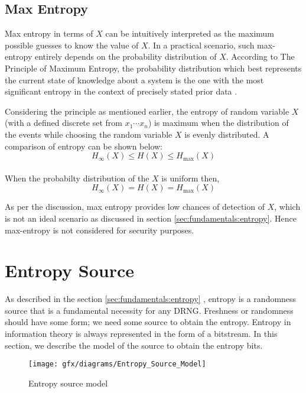%
%
\subsection{Max Entropy}
\label{subsec:fundamentals:types:max}
Max entropy in terms of $X$ can be intuitively interpreted as the maximum possible guesses to know the value of $X$. In a practical scenario, such max-entropy entirely depends on the probability distribution of $X$. According to The Principle of Maximum Entropy, the probability distribution which best represents the current state of knowledge about a system is the one with the most significant entropy in the context of precisely stated prior data \cite{MEP-1985}.

Considering the principle as mentioned earlier, the entropy of random variable $X$ (with a defined discrete set from $x_{1} \cdots x_{n}$) is maximum when the distribution of the events while choosing the random variable $X$ is evenly distributed. A comparison of entropy can be shown below: 
\begin{equation*}
H_{\infty}(X) \le H(X) \le H_{\max}(X)
\end{equation*}\\
When the probabilty distribution of the $X$ is uniform then,
\begin{equation*}
H_{\infty}(X) = H(X) = H_{\max}(X)
\end{equation*}

As per the discussion, max entropy provides low chances of detection of $X$, which is not an ideal scenario as discussed in section \ref{sec:fundamentals:entropy}. Hence max-entropy is not considered for security purposes.

%
%
\section{Entropy Source}
\label{sec:fundamentals:entropysource}
As described in the section \ref{sec:fundamentals:entropy} \cite{SP90B-2018}, entropy is a randomness source that is a fundamental necessity for any DRNG. Freshness or randomness should have some form; we need some source to obtain the entropy. Entropy in information theory is always represented in the form of a bitstream. In this section, we describe the model of the source to obtain the entropy bits.

\begin{figure}[htbp]
	\centering
	\texttt{[image: gfx/diagrams/Entropy\_Source\_Model]}
	\caption{Entropy source model}
	\label{fig:2:2}
\end{figure}

